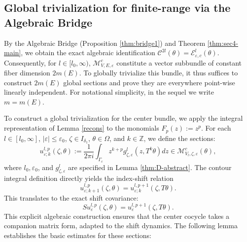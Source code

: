 \documentclass[reqno,11pt]{amsart}
\newcommand{\Z}{{\mathbb Z}}
\begin{document}
\subsection{Global trivialization for finite-range via the Algebraic Bridge}
By the Algebraic Bridge  (Proposition \ref{thm:bridge1}) and Theorem \ref{thm:sec4-main}, we obtain the exact algebraic identification $\mathcal{C}^{2l}(\theta)=\mathcal{E}^{l}_{\varepsilon,c}(\theta)$. Consequently, for  $l \in[ l_0,\infty)$, $\boldsymbol{\mathcal M}^c_{V,E,\varepsilon}$ constitute a vector subbundle of constant fiber dimension $2m(E)$. To globally trivialize this bundle, it thus suffices to construct $2m(E)$ global sections and prove they are everywhere point-wise linearly independent. For notational simplicity, in the sequel we write $m=m(E)$.



To construct a global trivialization for the center bundle, we apply the integral representation of Lemma \ref{recons} to the monomials $F_p(z) := z^p$. For each $l\in[l_0,\infty]$, $|\varepsilon|\le \varepsilon_0$, $\zeta\in I_{\delta_1}$, $\theta\in \Omega$, and $k\in \Z$, we define the sections:
\begin{equation}\label{equ:basis1}
u^{l,p}_{\varepsilon; k}(\zeta,\theta) := \frac{1}{2\pi i}\int_{\Gamma_c} z^{k+p} g^{l}_{\zeta,\varepsilon}(z,T^k\theta) dz \in \mathcal{M}^c_{V_l,\zeta,\varepsilon}(\theta),
\end{equation}
where $l_0, \varepsilon_0$, and $g^{l}_{\zeta,\varepsilon}$ are specified in Lemma \ref{thm:D-abstract}.
The contour integral definition directly yields the index-shift relation 
\begin{equation*}
    u^{l,p}_{\varepsilon;k+1}(\zeta,\theta)=u^{l,p+1}_{\varepsilon; k}(\zeta,T\theta).
\end{equation*}This translates to the exact shift covariance:
\begin{equation}\label{equ:strans}
S u^{l,p}_{\varepsilon}(\zeta,\theta) = u^{l,p+1}_{\varepsilon}(\zeta,T\theta).
\end{equation}
This explicit algebraic construction ensures that the center cocycle takes a companion matrix form,  adapted to the shift dynamics. 
The following lemma establishes the basic estimates for these sections:
\end{document}
